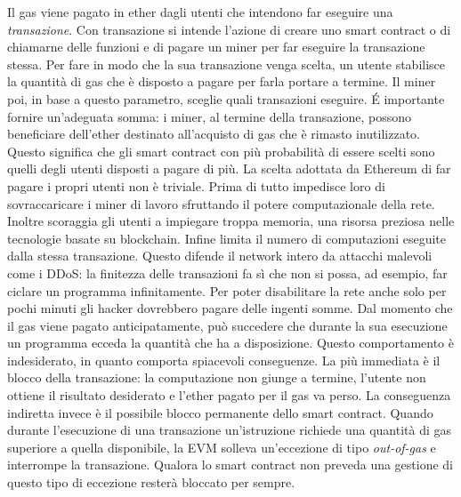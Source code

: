 Il gas viene pagato in ether dagli utenti che intendono far eseguire una \textit{transazione}. Con transazione si intende l'azione di creare uno smart contract o di chiamarne delle funzioni e di pagare un miner per far eseguire la transazione stessa.\newline
Per fare in modo che la sua transazione venga scelta, un utente stabilisce la quantità di gas che è disposto a pagare per farla portare a termine. Il miner poi, in base a questo parametro, sceglie quali transazioni eseguire. \'E importante fornire un'adeguata somma: i miner, al termine della transazione, possono beneficiare dell'ether destinato all'acquisto di gas che è rimasto inutilizzato. Questo significa che gli smart contract con più probabilità di essere scelti sono quelli degli utenti disposti a pagare di più.\newline
La scelta adottata da Ethereum di far pagare i propri utenti non è triviale. Prima di tutto impedisce loro di sovraccaricare i miner di lavoro sfruttando il potere computazionale della rete. Inoltre scoraggia gli utenti a impiegare troppa memoria, una risorsa preziosa nelle tecnologie basate su blockchain. Infine limita il numero di computazioni eseguite dalla stessa transazione. Questo difende il network intero da attacchi malevoli come i DDoS: la finitezza delle transazioni fa sì che non si possa, ad esempio, far ciclare un programma infinitamente. Per poter disabilitare la rete anche solo per pochi minuti gli hacker dovrebbero pagare delle ingenti somme.\newline
Dal momento che il gas viene pagato anticipatamente, può succedere che durante la sua esecuzione un programma ecceda la quantità che ha a disposizione. Questo comportamento è  indesiderato, in quanto comporta spiacevoli conseguenze. La più immediata è il blocco della transazione: la computazione non giunge a termine, l'utente non ottiene il risultato desiderato e l'ether pagato per il gas va perso.\newline 
La conseguenza indiretta invece è il possibile blocco permanente dello smart contract. Quando durante l'esecuzione di una transazione un'istruzione richiede una quantità di gas superiore a quella disponibile, la EVM solleva un'eccezione di tipo \textit{out-of-gas} e interrompe la transazione. Qualora lo smart contract non preveda una gestione di questo tipo di eccezione resterà bloccato per sempre.\newline



